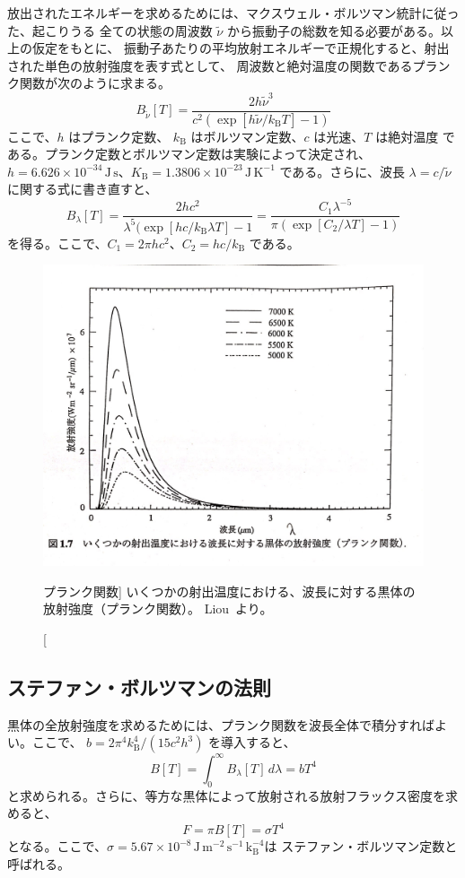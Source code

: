 \documentclass[article]{dennou777}
\newcommand{\Unit}[1]{\,\mathrm{#1}}
\begin{document}
放出されたエネルギーを求めるためには、マクスウェル・ボルツマン統計に従った、起こりうる
全ての状態の周波数 $\tilde\nu$ から振動子の総数を知る必要がある。以上の仮定をもとに、
振動子あたりの平均放射エネルギーで正規化すると、射出された単色の放射強度を表す式として、
周波数と絶対温度の関数であるプランク関数が次のように求まる。
\begin{equation}
	B_{\tilde{\nu}}[T]=\frac{2h\tilde{\nu}^3}{c^2(\exp[h\tilde{\nu}/k_\mathrm{B}T]-1)}
\end{equation}
ここで、$h$ はプランク定数、 $k_\mathrm{B}$ はボルツマン定数、$c$ は光速、$T$ は絶対温度
である。プランク定数とボルツマン定数は実験によって決定され、
$h=6.626\times10^{-34}\Unit{J\,s}$、$K_\mathrm{B}=1.3806\times10^{-23}\Unit{J\,K^{-1}}$
である。さらに、波長 $\lambda=c/\tilde\nu$ に関する式に書き直すと、
\begin{equation}
	B_\lambda[T]=\frac{2hc^2}{\lambda^5(\exp[hc/k_\mathrm{B}\lambda T]-1}=
	\frac{C_1\lambda^{-5}}{\pi(\exp[C_2/\lambda T]-1)}
\end{equation}
を得る。ここで、$C_1=2\pi hc^2$、$C_2=hc/k_\mathrm{B}$ である。

\begin{figure}[t]
	\includegraphics[width=\textwidth]{planck.jpg}
	\caption
		[プランク関数]
		{
			いくつかの射出温度における、波長に対する黒体の放射強度（プランク関数）。
			Liou~\cite{liou}より。
		}
\end{figure}

\subsection{ステファン・ボルツマンの法則}
黒体の全放射強度を求めるためには、プランク関数を波長全体で積分すればよい。ここで、
$b=2\pi^4k_\mathrm{B}^4/(15c^2h^3)$ を導入すると、
\begin{equation}
	B[T]=\int^\infty_0 B_\lambda[T]\,d\lambda=bT^4
\end{equation}
と求められる。さらに、等方な黒体によって放射される放射フラックス密度を求めると、
\begin{equation}
	F=\pi B[T]=\sigma T^4
\end{equation}
となる。ここで、$\sigma=5.67\times10^{-8}\Unit{J\,m^{-2}\,s^{-1}\,k_\mathrm{B}^{-4}}$は
ステファン・ボルツマン定数と呼ばれる。
\end{document}
